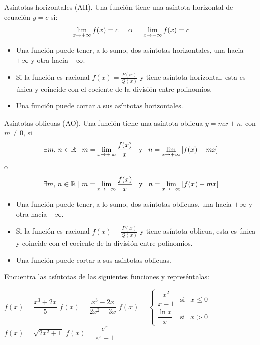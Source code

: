 \begin{definicion}{Asíntotas horizontales (AH).}
Una función tiene una asíntota horizontal de ecuación $y=c$ si:
$$\lim_{x\to+\infty}f(x)=c\hspace{5mm}\text{o}\hspace{5mm}\lim_{x\to-\infty}f(x)=c$$
\begin{itemize}
    \item Una función puede tener, a lo sumo, dos asíntotas horizontales, una hacia $+\infty$ y otra hacia $-\infty$.
    \item Si la función es racional $f(x)=\frac{P(x)}{Q(x)}$ y tiene asíntota horizontal, esta es única y coincide con el cociente de la división entre polinomios.
    \item Una función puede cortar a sus asíntotas horizontales.
\end{itemize}
\end{definicion}

\begin{definicion}{Asíntotas oblicuas (AO).}
Una función tiene una asíntota oblicua $y=mx+n$, con $m\ne0$, si
$$\exists m,\,n\in\mathbb{R}\mid m=\lim_{x\to+\infty}\frac{f(x)}{x}\hspace{3mm}\text{y}\hspace{3mm}n=\lim_{x\to+\infty}\left[f(x)-mx\right]$$
\hfil o \hfil
$$\exists m,\,n\in\mathbb{R}\mid m=\lim_{x\to-\infty}\frac{f(x)}{x}\hspace{3mm}\text{y}\hspace{3mm}n=\lim_{x\to-\infty}\left[f(x)-mx\right]$$
\begin{itemize}
    \item Una función puede tener, a lo sumo, dos asíntotas oblicuas, una hacia $+\infty$ y otra hacia $-\infty$.
    \item Si la función es racional $f(x)=\frac{P(x)}{Q(x)}$ y tiene asíntota oblicua, esta es única y coincide con el cociente de la división entre polinomios.
    \item Una función puede cortar a sus asíntotas oblicuas.
\end{itemize}
\end{definicion}

\begin{ejemplo}{
Encuentra las asíntotas de las siguientes funciones y represéntalas:
\begin{apartados}
    \ap $f(x)=\dfrac{x^3+2x}{5}$
    \ap $f(x)=\dfrac{x^3-2x}{2x^2+3x}$
    \ap $f(x)=\left\{\begin{array}{lcc}
            \dfrac{x^2}{x-1}&\text{si}&x\leqslant0\\
            \dfrac{\ln{x}}{x}&\text{si}&x>0
        \end{array}\right.$
    \ap $f(x)=\sqrt{2x^2+1}$
    \ap $f(x)=\dfrac{e^x}{e^x+1}$
\end{apartados}
}
\end{ejemplo}

